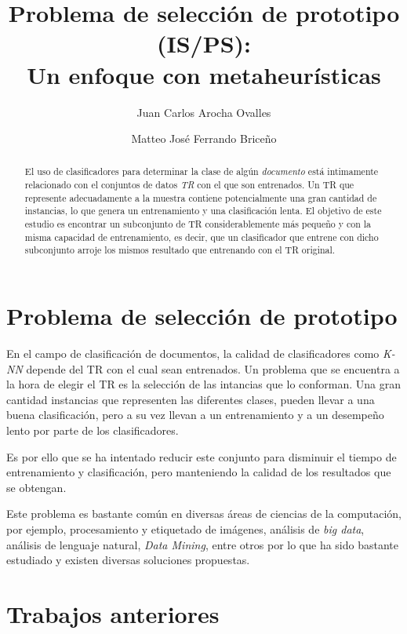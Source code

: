 \documentclass{ci5652}
\title{Problema de selección de prototipo (IS/PS):\\ 
       Un enfoque con metaheurísticas}
\author{Juan Carlos Arocha Ovalles
        \and
        Matteo José Ferrando Briceño}
\begin{document}
\thispagestyle{empty}
\maketitle


\begin{abstract}
El uso de clasificadores para determinar la clase de algún \textit{documento} está intimamente relacionado con el conjuntos de datos \textit{TR} con el que son entrenados. Un TR que represente adecuadamente a la muestra contiene potencialmente una gran cantidad de instancias, lo que genera un entrenamiento y una clasificación lenta. El objetivo de este estudio es encontrar un subconjunto de TR considerablemente más pequeño y con la misma capacidad de entrenamiento, es decir, que un clasificador que entrene con dicho subconjunto arroje los mismos resultado que entrenando con el TR original.


\end{abstract}

\section{Problema de selección de prototipo}

En el campo de clasificación de documentos, la calidad de clasificadores como \textit{K-NN} depende del TR con el cual sean entrenados. Un problema que se encuentra a la hora de elegir el TR es la selección de las intancias que lo conforman. Una gran cantidad instancias que representen las diferentes clases, pueden llevar a una buena clasificación, pero a su vez llevan a un entrenamiento y a un desempeño lento por parte de los clasificadores.

Es por ello que se ha intentado reducir este conjunto para disminuir el tiempo de entrenamiento y clasificación, pero manteniendo la calidad de los resultados que se obtengan.

Este problema es bastante común en diversas áreas de ciencias de la computación, por ejemplo, procesamiento y etiquetado de imágenes, análisis de \textit{big data}, análisis de lenguaje natural, \textit{Data Mining}, entre otros por lo que ha sido bastante estudiado y existen diversas soluciones propuestas.

\section{Trabajos anteriores}
\label{sect:works}
\end{document}
